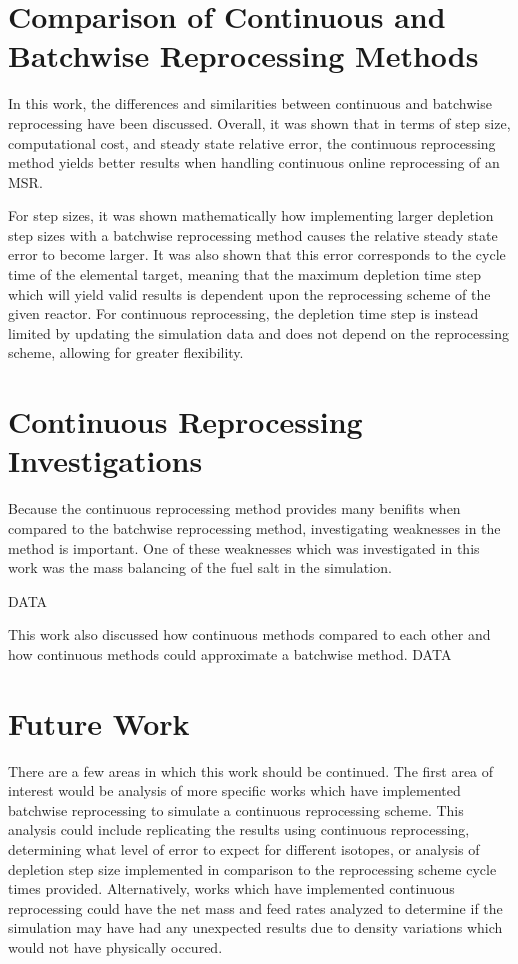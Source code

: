 \renewcommand*\descriptionlabel[1]{\hspace\leftmargin$#1$}
\setcounter{tocdepth}{5}
\setcounter{secnumdepth}{5}

\section{Comparison of Continuous and Batchwise Reprocessing Methods}

In this work, the differences and similarities between continuous and batchwise reprocessing have been discussed. Overall, it was shown that in terms of step size, computational cost, and steady state relative error, the continuous reprocessing method yields better results when handling continuous online reprocessing of an MSR.

For step sizes, it was shown mathematically how implementing larger depletion step sizes with a batchwise reprocessing method causes the relative steady state error to become larger. It was also shown that this error corresponds to the cycle time of the elemental target, meaning that the maximum depletion time step which will yield valid results is dependent upon the reprocessing scheme of the given reactor. For continuous reprocessing, the depletion time step is instead limited by updating the simulation data and does not depend on the reprocessing scheme, allowing for greater flexibility.

\section{Continuous Reprocessing Investigations}

Because the continuous reprocessing method provides many benifits when compared to the batchwise reprocessing method, investigating weaknesses in the method is important. One of these weaknesses which was investigated in this work was the mass balancing of the fuel salt in the simulation.

DATA

This work also discussed how continuous methods compared to each other and how continuous methods could approximate a batchwise method. DATA 

\section{Future Work}

There are a few areas in which this work should be continued. The first area of interest would be analysis of more specific works which have implemented batchwise reprocessing to simulate a continuous reprocessing scheme. This analysis could include replicating the results using continuous reprocessing, determining what level of error to expect for different isotopes, or analysis of depletion step size implemented in comparison to the reprocessing scheme cycle times provided. Alternatively, works which have implemented continuous reprocessing could have the net mass and feed rates analyzed to determine if the simulation may have had any unexpected results due to density variations which would not have physically occured.

